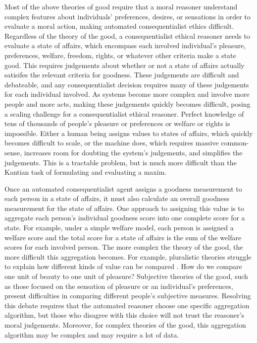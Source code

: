 \begin{isabellebody}
\begin{isamarkuptext}
Most of the above theories of good require that a moral reasoner understand complex features about
individuals' preferences, desires, or sensations in order to evaluate a moral action, making automated
consequentialist ethics difficult. Regardless of the theory of the good, a consequentialist ethical 
reasoner needs to evaluate a state of affairs, which encompass each involved individual's pleasure, 
preferences, welfare, freedom, rights, or whatever other criteria make a state good. This requires
judgements about whether or not a state of affairs actually satisifes the relevant criteria for goodness. 
These judgements are difficult and debateable, and any consequentialist decision requires many of 
these judgements for each individual involved. As systems become more complex and involve more people and 
more acts, making these judgements quickly becomes difficult, posing a scaling challenge for a 
consequentialist ethical reasoner. Perfect knowledge of tens of thousands of people's pleasure or 
preferences or welfare or rights is impossible. Either a human being 
assigns values to states of affairs, which quickly becomes difficult to scale, or the machine does, 
which requires massive common-sense, increases room for doubting the system's judgements, and simplifies
the judgements. This is a tractable problem, but is much more difficult than the Kantian task of formulating
and evaluating a maxim.%
\end{isamarkuptext}\isamarkuptrue%
%
\isadelimdocument
%
\endisadelimdocument
%
\isatagdocument
%
\isamarkuptrue%
%
\endisatagdocument
{\isafolddocument}%
%
\isadelimdocument
%
\endisadelimdocument
%
\begin{isamarkuptext}%
Once an automated consequentialist agent assigns a goodness measurement to each person in a state of affairs, it 
must also calculate an overall goodness measurement for the state of affairs. One approach to assigning
this value is to aggregate each person's individual goodness score into one complete score for a state. 
For example, under a simple welfare model, each person is assigned a welfare score and the total 
score for a state of affairs is the sum of the welfare scores for each involved person.
The more complex the theory of the good, the more difficult this aggregation becomes. For example, 
pluralistic theories struggle to explain how different kinds of value can be compared \cite{consequentialismsep}. 
How do we compare one unit of beauty to one unit of pleasure? Subjective theories of the good, such 
as those focused on the sensation of pleasure or an individual's preferences, present difficulties in 
comparing different people's subjective measures. Resolving this debate requires that the automated reasoner 
choose one specific aggregation algorithm, but those who disagree with this choice will not trust 
the reasoner's moral judgements. Moreover, for complex theories of the good, this aggregation algorithm
may be complex and may require a lot of data. 


\end{isamarkuptext}
\end{isabellebody}
